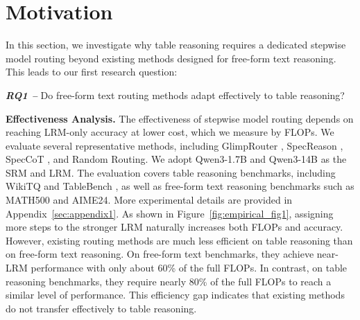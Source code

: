 \documentclass[11pt]{article}
\begin{document}
\vspace{-4pt}

\section{Motivation}
\label{sec2}
\vspace{-2pt}
In this section, we investigate why table reasoning requires a dedicated stepwise model routing beyond existing methods designed for free-form text reasoning. This leads to our first research question:

\begin{tcolorbox}[
    colback=yellow!10!white,      %
    colframe=black,            %
    coltitle=white,            %
    fonttitle=\bfseries,       %
    boxrule=.7pt,
    width=\linewidth,
    top=1mm,
    bottom=1mm,
    left=2mm,                  %
    right=2mm,                 %
    before skip=6pt, after skip=6pt
]
\vspace{-1pt}
\textit{\textbf{RQ1 --}} Do free-form text routing methods adapt effectively to table reasoning?
\vspace{-1pt}
\end{tcolorbox}

\textbf{Effectiveness Analysis.} 
The effectiveness of stepwise model routing depends on reaching LRM-only accuracy at lower cost, which we measure by FLOPs. We evaluate several representative methods, including GlimpRouter \citep{zeng2026glimprouter}, SpecReason \citep{pan2025specreason}, SpecCoT \citep{shi-etal-2025-speccot}, and Random Routing. We adopt Qwen3-1.7B and Qwen3-14B \citep{yang2025qwen3} as the SRM and LRM. The evaluation covers table reasoning benchmarks, including WikiTQ \citep{pasupat2015compositional} and TableBench \citep{wu2025tablebench}, as well as free-form text reasoning benchmarks such as MATH500 \citep{lightman2023let} and AIME24. More experimental details are provided in Appendix~\ref{sec:appendix1}.
As shown in Figure~\ref{fig:empirical_fig1}, assigning more steps to the stronger LRM naturally increases both FLOPs and accuracy. However, existing routing methods are much less efficient on table reasoning than on free-form text reasoning. On free-form text benchmarks, they achieve near-LRM performance with only about 60\% of the full FLOPs. In contrast, on table reasoning benchmarks, they require nearly 80\% of the full FLOPs to reach a similar level of performance. This efficiency gap indicates that existing methods do not transfer effectively to table reasoning.
\end{document}
